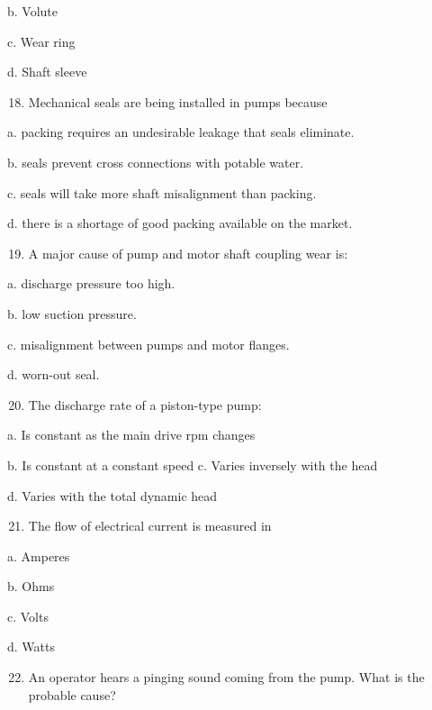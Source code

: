 \documentclass[10pt]{article}
\begin{document}
\begin{enumerate}
\begin{enumerate}
b. Volute

c. Wear ring

d. Shaft sleeve

\begin{enumerate}
  \setcounter{enumi}{17}
  \item Mechanical seals are being installed in pumps because
\end{enumerate}

a. packing requires an undesirable leakage that seals eliminate.

b. seals prevent cross connections with potable water.

c. seals will take more shaft misalignment than packing.

d. there is a shortage of good packing available on the market.

\begin{enumerate}
  \setcounter{enumi}{18}
  \item A major cause of pump and motor shaft coupling wear is:
\end{enumerate}

a. discharge pressure too high.

b. low suction pressure.

c. misalignment between pumps and motor flanges.

d. worn-out seal.

\begin{enumerate}
  \setcounter{enumi}{19}
  \item The discharge rate of a piston-type pump:
\end{enumerate}

a. Is constant as the main drive rpm changes

b. Is constant at a constant speed c. Varies inversely with the head

d. Varies with the total dynamic head

\begin{enumerate}
  \setcounter{enumi}{20}
  \item The flow of electrical current is measured in
\end{enumerate}

a. Amperes

b. Ohms

c. Volts

d. Watts

\begin{enumerate}
  \setcounter{enumi}{21}
  \item An operator hears a pinging sound coming from the pump. What is the probable cause?
\end{enumerate}


\end{enumerate}
\end{enumerate}
\end{document}
